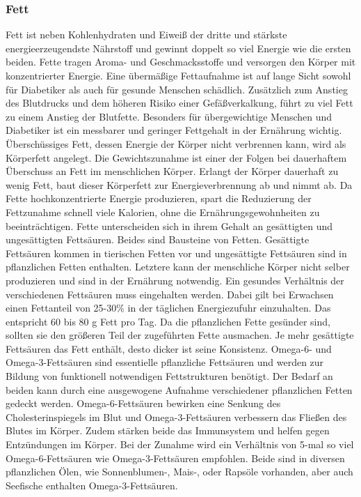 	\subsubsection{Fett}
		Fett ist neben Kohlenhydraten und Eiweiß der dritte und stärkste energieerzeugendste Nährstoff und gewinnt doppelt so viel Energie wie die ersten beiden. Fette tragen Aroma- und Geschmacksstoffe und versorgen den Körper mit konzentrierter Energie. Eine übermäßige Fettaufnahme ist auf lange Sicht sowohl für Diabetiker als auch für gesunde Menschen schädlich. Zusätzlich zum Anstieg des Blutdrucks und dem höheren Risiko einer Gefäßverkalkung, führt zu viel Fett zu einem Anstieg der Blutfette. Besonders für übergewichtige Menschen und Diabetiker ist ein messbarer und geringer Fettgehalt in der Ernährung wichtig. \cite{SG} Überschüssiges Fett, dessen Energie der Körper nicht verbrennen kann, wird als Körperfett angelegt. Die Gewichtszunahme ist einer der Folgen bei dauerhaftem Überschuss an Fett im menschlichen Körper. Erlangt der Körper dauerhaft zu wenig Fett, baut dieser Körperfett zur Energieverbrennung ab und nimmt ab.\cite{ND} Da Fette hochkonzentrierte Energie produzieren, spart die Reduzierung der Fettzunahme schnell viele Kalorien, ohne die Ernährungsgewohnheiten zu beeinträchtigen.\cite{SG}\newline
		Fette unterscheiden sich in ihrem Gehalt an gesättigten und ungesättigten Fettsäuren. Beides sind Bausteine von Fetten. Gesättigte Fettsäuren kommen in tierischen Fetten vor und ungesättigte Fettsäuren sind in pflanzlichen Fetten enthalten. Letztere kann der menschliche Körper nicht selber produzieren und sind in der Ernährung notwendig. Ein gesundes Verhältnis der verschiedenen Fettsäuren muss eingehalten werden. Dabei gilt bei Erwachsen einen Fettanteil von 25-30\% in der täglichen Energiezufuhr einzuhalten. Das entspricht 60 bis 80 g Fett pro Tag. Da die pflanzlichen Fette gesünder sind, sollten sie den größeren Teil der zugeführten Fette ausmachen. Je mehr gesättigte Fettsäuren das Fett enthält, desto dicker ist seine Konsistenz. \newline
		Omega-6- und Omega-3-Fettsäuren sind essentielle pflanzliche Fettsäuren und werden zur Bildung von funktionell notwendigen Fettstrukturen benötigt. Der Bedarf an beiden kann durch eine ausgewogene Aufnahme verschiedener pflanzlichen Fetten gedeckt werden. Omega-6-Fettsäuren bewirken eine Senkung des Cholesterinspiegels im Blut und Omega-3-Fettsäuren verbessern das Fließen des Blutes im Körper. Zudem stärken beide das Immunsystem und helfen gegen Entzündungen im Körper. Bei der Zunahme wird ein Verhältnis von 5-mal so viel Omega-6-Fettsäuren wie Omega-3-Fettsäuren empfohlen. Beide sind in diversen pflanzlichen Ölen, wie Sonnenblumen-, Mais-, oder Rapsöle vorhanden, aber auch Seefische enthalten Omega-3-Fettsäuren.\cite{ND}\newline
